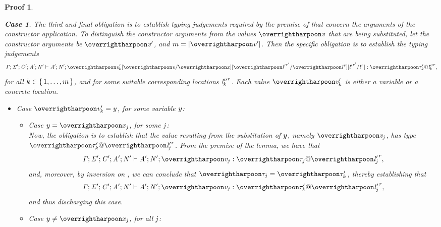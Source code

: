 \documentclass[showabstract,showacknowledgments,showpreface,showdedication]{iuphd}
\newtheorem*{bcase}{Case}
\theoremstyle{nonumberplain}
\newtheorem{nproof}{Proof}
\begin{document}
\begin{nproof}
\begin{bcase}
    The third and final obligation is to establish typing judgements required by the premise of \tdatacon{}
    that concern the arguments of the constructor application.
    To distinguish the constructor arguments from the values $\overharpoon{\VAL}$ that are being substituted,
    let the constructor arguments be $\overharpoon{\VAL'}$, and $m = |\overharpoon{\VAL'}|$.
    Then the specific obligation is to establish the typing judgements
    \begin{displaymath}
       \TENV;\SENV';\CENV';\AENV';\NENV' \vdash \AENV';\NENV';\substlemmasubsts{\overharpoon{\VAL'_{k}}} : \overharpoon{\tyatlocreg{\TYP_{k}'}{\loc''_{k}}{\reg}},
     \end{displaymath}
     for all $k \in \{ \, 1, \ldots, m \,\}$, and for some suitable corresponding locations
     ${\mathit{l}''_{k}}^{\mathit{r}}$.
     Each value $\overharpoon{\VAL'_k}$ is either a variable or a concrete location.
    \begin{itemize}
    \item Case $\overharpoon{\VAL'_k} = \yvar$, for some variable $y$:\\
      \begin{itemize}
      \item Case $\yvar = \overharpoon{\var_{\indj}}$, for some $\mathit{j}$:\\
        Now, the obligation is to establish that the value resulting from the substitution of $y$, namely
        $\overharpoon{\VAL_{\indj}}$, has type $\overharpoon{\TYP'_{k}} \ensuremath{@} \overharpoon{\locreg{\loc'_{\indj}}{\reg}}$.
        From the premise of the lemma, we have that
        \begin{displaymath}
        \TENV; \SENV'; \CENV'; \AENV'; \NENV' \vdash \AENV'; \NENV'; \overharpoon{\VAL_j} : \overharpoon{\TYP_j} \ensuremath{@} \overharpoon{\locreg{\loc'_j}{\reg}},
        \end{displaymath}
        and, moreover, by inversion on \tdatacon{}, we can conclude that $\overharpoon{\TYP_j} = \overharpoon{\TYP'_k}$,
        thereby establishing that
       \begin{displaymath}
        \TENV; \SENV'; \CENV'; \AENV'; \NENV' \vdash \AENV'; \NENV'; \overharpoon{\VAL_j} : \overharpoon{\TYP'_k} \ensuremath{@} \overharpoon{\locreg{\loc'_j}{\reg}},
        \end{displaymath}
        and thus discharging this case.
      \item Case $\yvar \neq \overharpoon{\var_{\indj}}$, for all $\mathit{j}$:\\

\end{itemize}
\end{itemize}
\end{bcase}
\end{nproof}
\end{document}
